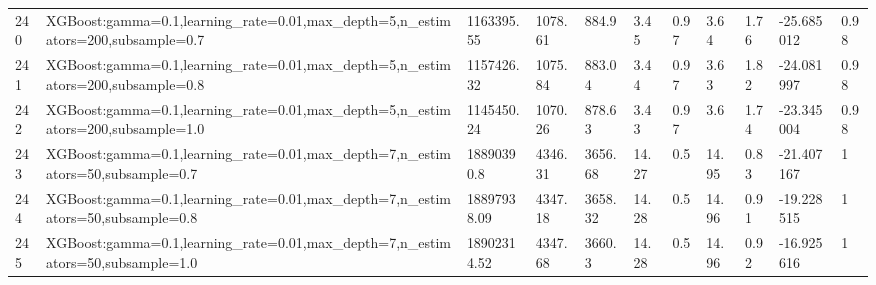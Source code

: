 \begin{longtable}{C{0.8cm} L{2cm} C{1.15cm} C{1.15cm} C{1.15cm} C{1.15cm} C{0.85cm} C{1.25cm} C{1.2cm} C{1.5cm} C{1.0cm}}
240 & XGBoost:\newline gamma=0.1,\newline learning\_rate=0.01,\newline max\_depth=5,\newline n\_estimators=200,\newline subsample=0.7 & 1163395.55 & 1078.61 & 884.9 & 3.45 & 0.97 & 3.64 & 1.76 & -25.685012 & 0.98 \\
241 & XGBoost:\newline gamma=0.1,\newline learning\_rate=0.01,\newline max\_depth=5,\newline n\_estimators=200,\newline subsample=0.8 & 1157426.32 & 1075.84 & 883.04 & 3.44 & 0.97 & 3.63 & 1.82 & -24.081997 & 0.98 \\
242 & XGBoost:\newline gamma=0.1,\newline learning\_rate=0.01,\newline max\_depth=5,\newline n\_estimators=200,\newline subsample=1.0 & 1145450.24 & 1070.26 & 878.63 & 3.43 & 0.97 & 3.6 & 1.74 & -23.345004 & 0.98 \\
243 & XGBoost:\newline gamma=0.1,\newline learning\_rate=0.01,\newline max\_depth=7,\newline n\_estimators=50,\newline subsample=0.7 & 18890390.8 & 4346.31 & 3656.68 & 14.27 & 0.5 & 14.95 & 0.83 & -21.407167 & 1 \\
244 & XGBoost:\newline gamma=0.1,\newline learning\_rate=0.01,\newline max\_depth=7,\newline n\_estimators=50,\newline subsample=0.8 & 18897938.09 & 4347.18 & 3658.32 & 14.28 & 0.5 & 14.96 & 0.91 & -19.228515 & 1 \\
245 & XGBoost:\newline gamma=0.1,\newline learning\_rate=0.01,\newline max\_depth=7,\newline n\_estimators=50,\newline subsample=1.0 & 18902314.52 & 4347.68 & 3660.3 & 14.28 & 0.5 & 14.96 & 0.92 & -16.925616 & 1 \\

\end{longtable}
